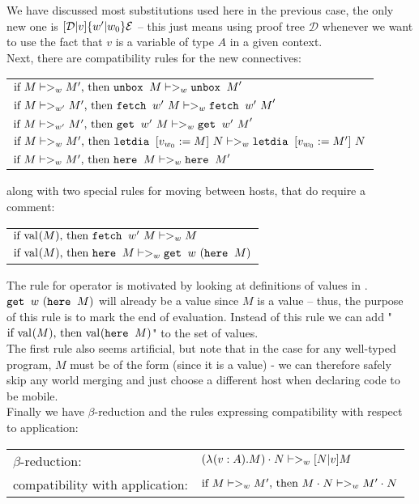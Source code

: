 We have discussed most substitutions used here in the previous case, the only new one is $\substt {\mathcal D} v {\substw {w'} {w_0} {\mathcal E}}$ --  this just means using proof tree $\mathcal D$ whenever we want to use the fact that $v$ is a variable of type $A$ in a given context.\\

Next, there are compatibility rules for the new connectives:
\begin{spacing}{1.5}
\begin{tabular}{ l }
$\ifthen{M|->_w M'} {\unbox M |->_w \unbox M'}$\\
$\ifthen{M|->_{w'} M'} {\fetch {w'} M |->_{w} \fetch {w'} M'}$\\
$\ifthen{M|->_{w'} M'} {\get {w'} M |->_{w} \get {w'} M'}$\\
$\ifthen{M|->_w M'} {\letdia v {w_0} M  N |->_w \letdia v {w_0} {M'} N}$\\
$\ifthen{M|->_w M'} {\here M |->_w \here M'}$
\end{tabular}
\end{spacing}

along with two special rules for moving between hosts, that do require a comment:
\begin{spacing}{1.5}
\begin{tabular}{ l }
$\ifthen{\val M} {\fetch {w'} M |->_w M}$\\
$\ifthen{\val M} {\here M |->_w \get w (\here M)}$
\end{tabular}
\end{spacing}


The rule for \heree{} operator is motivated by looking at definitions of values in \langL{}. $\get{w}{(\here M)}$ will already be a value since $M$ is a value -- thus, the purpose of this rule is to mark the end of evaluation. Instead of this rule we can add "$\ifthen {\val M} {\val{\here{M}}}$" to the set of values.\\
The first rule also seems artificial, but note that in the \fetche{} case for any well-typed program, $M$ must be of the form  (since it is a value) - we can therefore safely skip any world merging and just choose a different host when declaring code to be mobile.\\

Finally we have $\beta$-reduction and the rules expressing compatibility with respect to application:\\

\begin{spacing}{1.5}
\begin{tabular}{ l l}
$\beta$-reduction: & $ \appl {(\lam v A M)} {N} |->_w \substt{N}{v}{M}$\\
compatibility with application: & $ \ifthen {M |->_w M'} {\appl{M}{N} |->_w \appl{M'}{N}}$
\end{tabular}
\end{spacing}

